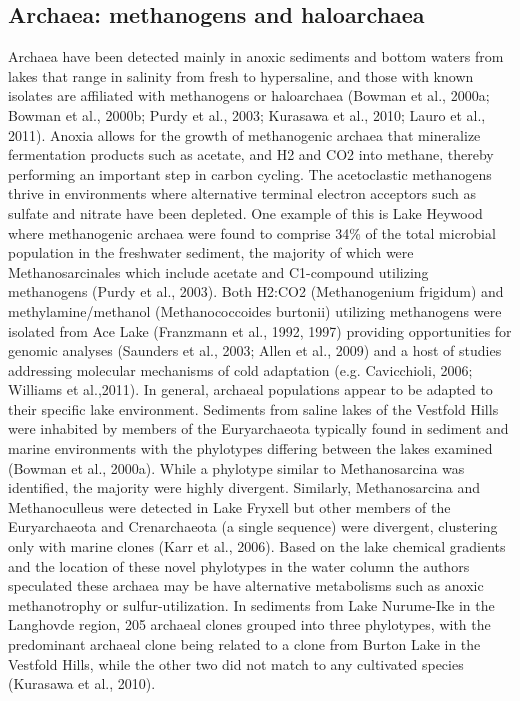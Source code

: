 \documentclass{book}
\begin{document}
\subsection{Archaea: methanogens and haloarchaea}
Archaea have been detected mainly in anoxic sediments and bottom waters from lakes that range in salinity from fresh to hypersaline, and those with known isolates are affiliated with methanogens or haloarchaea (Bowman et al., 2000a; Bowman et al., 2000b; Purdy et al., 2003; Kurasawa et al., 2010; Lauro et al., 2011).%
Anoxia allows for the growth of methanogenic archaea that mineralize fermentation products such as acetate, and H2 and CO2 into methane, thereby performing an important step in carbon cycling.
The acetoclastic methanogens thrive in environments where alternative terminal electron acceptors such as sulfate and nitrate have been depleted. 
One example of this is Lake Heywood where methanogenic archaea were found to comprise 34\% of the total microbial population in the freshwater sediment, the majority of which were Methanosarcinales which include acetate and C1-compound utilizing methanogens (Purdy et al., 2003). 
Both H2:CO2 (Methanogenium frigidum) and methylamine/methanol (Methanococcoides burtonii) utilizing methanogens were isolated from Ace Lake (Franzmann et al., 1992, 1997) providing opportunities for genomic analyses (Saunders et al., 2003; Allen et al., 2009) and a host of studies addressing molecular mechanisms of cold adaptation (e.g. Cavicchioli, 2006; Williams et al.,2011).
In general, archaeal populations appear to be adapted to their specific lake environment.
Sediments from saline lakes of the Vestfold Hills were inhabited by members of the Euryarchaeota typically found in sediment and marine environments with the phylotypes differing between the lakes examined (Bowman et al., 2000a). 
While a phylotype similar to Methanosarcina was identified, the majority were highly divergent. 
Similarly, Methanosarcina and Methanoculleus were detected in Lake Fryxell but other members of the Euryarchaeota and Crenarchaeota (a single sequence) were divergent, clustering only with marine clones (Karr et al., 2006). 
Based on the lake chemical gradients and the location of these novel phylotypes in the water column the authors speculated these archaea may be have alternative metabolisms such as anoxic methanotrophy or sulfur-utilization. 
In sediments from Lake Nurume-Ike in the Langhovde region, 205 archaeal clones grouped into three phylotypes, with the predominant archaeal clone being related to a clone from Burton Lake in the Vestfold Hills, while the other two did not match to any cultivated species (Kurasawa et al., 2010). 
\end{document}
